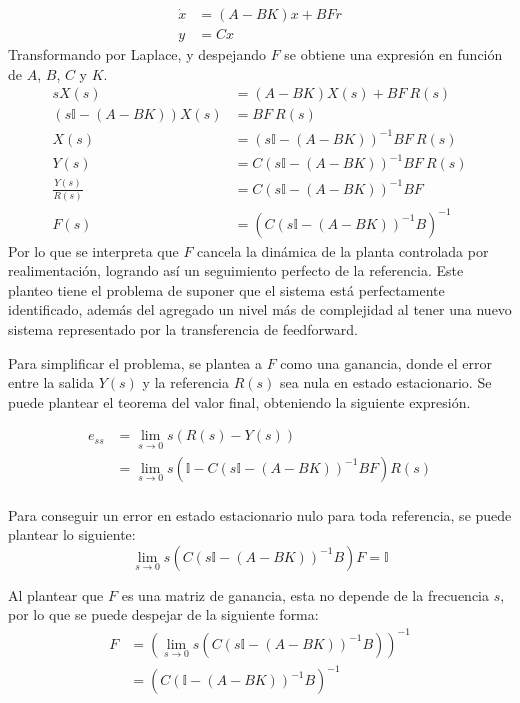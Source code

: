 \documentclass[a4paper,10pt]{article}
\begin{document}
\begin{align*}
    \dot{x} &= (A - BK) x + BF r \\
    y &= C x
\end{align*}
Transformando por Laplace, y despejando $F$ se obtiene una expresión en función de $A$, $B$, $C$ y $K$.
\begin{align*}
    s X(s) &= (A - BK) X(s) + BF ~ R(s) \\
    (s \mathbb{I} - (A - BK)) X(s) &= BF ~ R(s) \\
    X(s) &= (s \mathbb{I} - (A - BK))^{-1} BF ~ R(s) \\
    Y(s) &= C (s \mathbb{I} - (A - BK))^{-1} BF ~ R(s) \\
    \frac{Y(s)}{R(s)} &= C (s \mathbb{I} - (A - BK))^{-1} BF \\
    F(s) &= (C (s \mathbb{I} - (A - BK))^{-1} B)^{-1}
\end{align*}
Por lo que se interpreta que $F$ cancela la dinámica de la planta controlada por realimentación, logrando así un seguimiento perfecto de la referencia. Este planteo tiene el problema de suponer que el sistema está perfectamente identificado, además del agregado un nivel más de complejidad al tener una nuevo sistema representado por la transferencia de feedforward. 

Para simplificar el problema, se plantea a $F$ como una ganancia, donde el error entre la salida $Y(s)$ y la referencia $R(s)$ sea nula en estado estacionario. Se puede plantear el teorema del valor final, obteniendo la siguiente expresión.

\begin{align*}
    e_{ss} &= \lim_{s \to 0} s (R(s) - Y(s)) \\ 
     &= \lim_{s \to 0} s \left(\mathbb{I} - C (s \mathbb{I} - (A - BK))^{-1} BF \right) R(s) \\
\end{align*}

Para conseguir un error en estado estacionario nulo para toda referencia, se puede plantear lo siguiente:
\begin{equation*}
    \lim_{s \to 0} s \left(C (s \mathbb{I} - (A - BK))^{-1} B \right) F = \mathbb{I} 
\end{equation*}

Al plantear que $F$ es una matriz de ganancia, esta no depende de la frecuencia $s$, por lo que se puede despejar de la siguiente forma:
\begin{align*}
    F &= \left( \lim_{s \to 0} s \left(C (s \mathbb{I} - (A - BK))^{-1} B \right) \right)^{-1} \\
     &= \left(C (\mathbb{I} - (A - BK))^{-1} B \right)^{-1} 
\end{align*}
\end{document}
